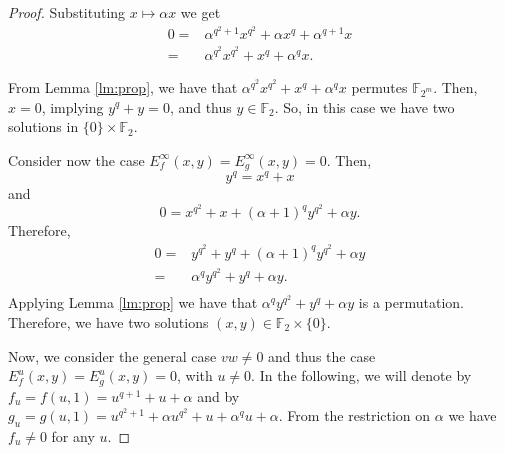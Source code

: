 \documentclass{article}
\begin{document}
\begin{proof}
Substituting $x\mapsto\alpha x$ we get
$$
\begin{aligned}
0=&\alpha^{q^2+1} x^{q^2}+\alpha{x^q}+\alpha^{q+1}x\\
=&\alpha^{q^2} x^{q^2}+{x^q}+\alpha^{q}x.
\end{aligned}
$$

From Lemma \ref{lm:prop}, we have that $\alpha^{q^2} x^{q^2}+{x^q}+\alpha^{q}x$ permutes $\mathbb{F}_{2^m}$. Then, $x=0$, implying $ y^q+y=0$, and thus $y\in\mathbb{F}_2$. So, in this case we have two solutions in $\{0\}\times\mathbb{F}_2$.

Consider now the case $E_f^\infty(x,y)=E_g^\infty(x,y)=0$. Then,
$$
y^q=x^q+x
$$
and
$$
0=x^{q^2}+x+(\alpha+1)^qy^{q^2}+\alpha y.
$$
Therefore,
$$
\begin{aligned}
0=&y^{q^2}+y^q+(\alpha+1)^qy^{q^2}+\alpha y\\
=&\alpha^q y^{q^2}+y^q+\alpha y.\\
\end{aligned}
$$
Applying Lemma \ref{lm:prop} we have that $\alpha^q y^{q^2}+y^q+\alpha y$ is a permutation. Therefore, we have two solutions $(x,y)\in\mathbb{F}_2\times\{0\}$.

Now, we consider the general case $vw\ne 0$ and thus the case $E_f^u(x,y)=E_g^u(x,y)=0$, with $u\ne0$.
In the following, we will denote by $f_u=f(u,1)=u^{q+1}+u+\alpha$ and by $g_u=g(u,1)=u^{q^2+1}+\alpha u^{q^2}+u+\alpha^qu+\alpha$.
From the restriction on $\alpha$ we have $f_u\ne0$ for any $u$.%



\end{proof}
\end{document}
